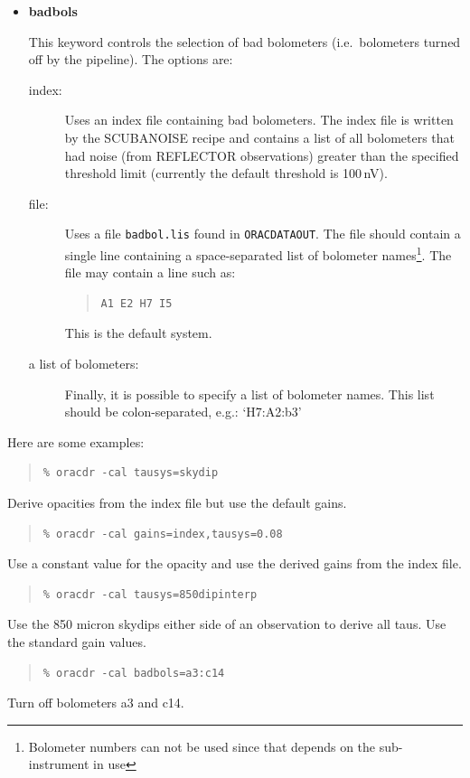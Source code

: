 \documentclass[twoside,11pt]{article}
\renewcommand{\_}{\texttt{\symbol{95}}}
\newcommand{\recipe}[1]{{\small\textsf{#1}}}
\newenvironment{myquote}{\begin{quote}\begin{small}}{\end{small}\end{quote}}
\begin{document}
\begin{itemize}
\item \textbf{badbols} \mbox{}

This keyword controls the selection of bad bolometers (i.e.\ bolometers
turned off by the pipeline). The options are:

\begin{description}
\item[index:] Uses an index file containing bad bolometers. The index
file is written by the \recipe{SCUBA\_NOISE} recipe and contains a list
of all bolometers that had noise (from REFLECTOR observations) greater than
the specified threshold limit (currently the default threshold is 100\,nV).
\item[file:] Uses a file \verb|badbol.lis| found
in \texttt{ORAC\_DATA\_OUT}.
The file should contain a single line containing a space-separated list
of bolometer names\footnote{Bolometer numbers can not be used since that
depends on the sub-instrument in use}. The file may contain a line such as:
\begin{myquote}
\begin{verbatim}
A1 E2 H7 I5
\end{verbatim}
\end{myquote}
This is the default system.
\item[a list of bolometers:] Finally, it is possible to specify a list of 
bolometer names. This list should be colon-separated, e.g.: `H7:A2:b3'

\end{description}

\end{itemize}

Here are some examples:

\begin{myquote}
\begin{verbatim}
% oracdr -cal tausys=skydip
\end{verbatim}
\end{myquote}
Derive opacities from the index file but use the default gains.
\begin{myquote}
\begin{verbatim}
% oracdr -cal gains=index,tausys=0.08
\end{verbatim}
\end{myquote}
Use a constant value for the opacity and use the derived gains
from the index file.
\begin{myquote}
\begin{verbatim}
% oracdr -cal tausys=850dipinterp
\end{verbatim}
\end{myquote}
Use the 850 micron skydips either side of an observation 
to derive all taus. Use the standard gain values.
\begin{myquote}
\begin{verbatim}
% oracdr -cal badbols=a3:c14
\end{verbatim}
\end{myquote}
Turn off bolometers a3 and c14.
\end{document}

